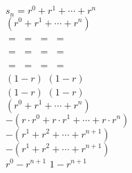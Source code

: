 \documentclass[border=6pt]{standalone}
\begin{document}
\parbox{2in}{$s_n = r^0 + r^1 + \cdots + r^n$ \vspace{1ex}\\
$(r^0 + r^1 + \cdots + r^n)$ \vspace{1ex}\\
$=$ \hspace{1em} $=$ \hspace{1em} $=$ \hspace{1em} $=$ \vspace{1ex}\\
$=$ \hspace{1em} $=$ \hspace{1em} $=$ \hspace{1em} $=$ \vspace{1ex}\\
$=$ \hspace{1em} $=$ \hspace{1em} $=$ \hspace{1em} $=$ \vspace{1ex}\\
$(1-r)$ \hspace{1em} $(1-r)$ \vspace{1ex}\\
$(1-r)$ \hspace{1em} $(1-r)$ \vspace{1ex}\\
$(r^0 + r^1 + \cdots + r^n)$ \vspace{1ex}\\
$- (r \cdot r^0 + r \cdot r^1 + \cdots + r \cdot r^n)$ \vspace{1ex}\\
$- (r^1 + r^2 + \cdots + r^{n+1})$ \vspace{1ex}\\
$- (r^1 + r^2 + \cdots + r^{n+1})$ \vspace{1ex}\\
$r^0 - r^{n+1}$ \hspace{1em} $1 - r^{n+1}$ \vspace{1ex}\\
}
\end{document}
